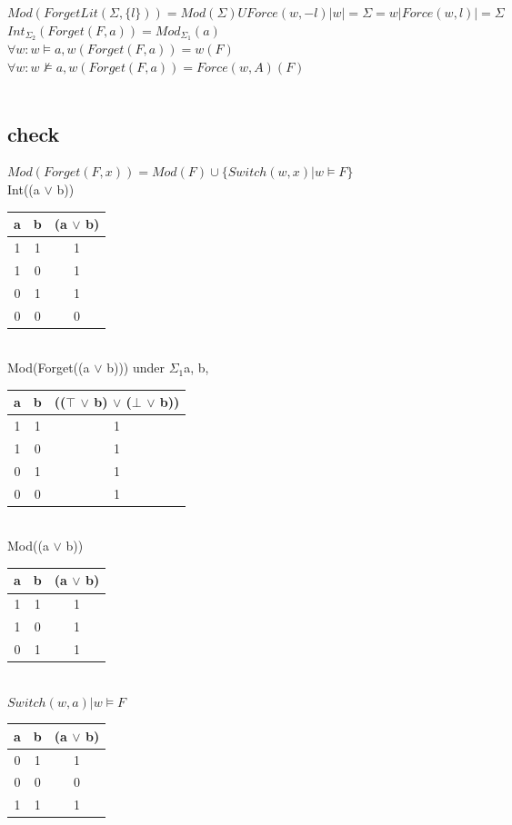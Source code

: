 $Mod(ForgetLit(\Sigma,\{ l \})) = Mod(\Sigma) U {Force(w,-l) | w|= \Sigma}
= {w | Force(w,l) |= \Sigma}$$Int_{\Sigma_2}(Forget(F,a)) = Mod_{\Sigma_1}(a)$\\$\forall w : w \models a, w(Forget(F,a)) = w(F)$\\$\forall w : w \not\models a, w(Forget(F,a)) = Force(w,A)(F)$\\\\\subsection{check}$Mod(Forget(F, x)) = Mod(F) \cup \{Switch(w, x) | w \models F\}$ \\
 Int((a $\lor$ b))\\
\begin{tabular}{| c | c | c |}
a & b & (a $\lor$ b) \\
\hline
1 & 1 & 1\\
1 & 0 & 1\\
0 & 1 & 1\\
0 & 0 & 0\\
\end{tabular}\
\\Mod(Forget((a $\lor$ b))) under $\Sigma_1$a, b, \\
\begin{tabular}{| c | c | c |}
a & b & (($\top$ $\lor$ b) $\lor$ ($\bot$ $\lor$ b)) \\
\hline
1 & 1 & 1\\
1 & 0 & 1\\
0 & 1 & 1\\
0 & 0 & 1\\
\end{tabular}\
\\Mod((a $\lor$ b))\\
\begin{tabular}{| c | c | c |}
a & b & (a $\lor$ b) \\
\hline
1 & 1 & 1\\
1 & 0 & 1\\
0 & 1 & 1\\
\end{tabular}\
\\$Switch(w,a) | w \models F $\\
\begin{tabular}{| c | c | c |}
a & b & (a $\lor$ b) \\
\hline
0 & 1 & 1\\
0 & 0 & 0\\
1 & 1 & 1\\
\end{tabular}\

